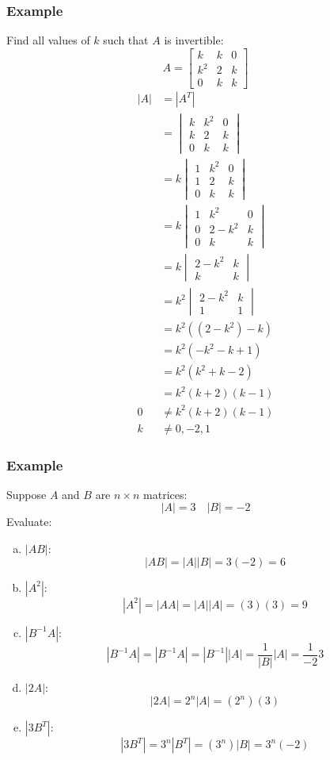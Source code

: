 \documentclass{math}
\begin{document}
\subsubsection*{Example}
Find all values of \( k \) such that \( A \) is invertible:
\[ A = \begin{bmatrix}k & k & 0 \\ k^2 & 2 & k \\ 0 & k & k\end{bmatrix} \]
\begin{align*}
  |A| &= |A^T| \\
  &= \begin{vmatrix}
    k & k^2 & 0 \\
    k & 2 & k \\
    0 & k & k
  \end{vmatrix} \\
  &= k\begin{vmatrix}
    1 & k^2 & 0 \\
    1 & 2 & k \\
    0 & k & k
  \end{vmatrix} \\
  &= k\begin{vmatrix}
    1 & k^2 & 0 \\
    0 & 2-k^2 & k \\
    0 & k & k
  \end{vmatrix} \\
  &= k\begin{vmatrix}
    2-k^2 & k \\
    k & k
  \end{vmatrix} \\
  &= k^2\begin{vmatrix}
    2-k^2 & k \\
    1 & 1
  \end{vmatrix} \\
  &= k^2((2-k^2)-k) \\
  &= k^2(-k^2-k+1) \\
  &= k^2(k^2+k-2) \\
  &= k^2(k+2)(k-1) \\
  0 &\ne k^2(k+2)(k-1) \\
  k &\ne 0,-2,1
\end{align*}

\subsubsection*{Example}
Suppose \( A \) and \( B \) are \( n\times n \) matrices:
\[ |A| = 3 \quad |B| = -2\]
Evaluate:
\begin{enumerate}[(a)]
  \item \( |AB| \):
  \[ |AB| = |A||B| = 3(-2) = 6 \]
  \item \( |A^2| \):
  \[ |A^2| = |AA| = |A||A| = (3)(3) = 9 \]
  \item \( |B^{-1}A| \):
  \[ |B^{-1}A| = |B^{-1}A| = |B^{-1}||A| = \frac{1}{|B|}|A| = \frac{1}{-2}3 \]
  \item \( |2A| \):
  \[ |2A| = 2^n|A| = (2^n)(3) \]
  \item \( |3B^T| \):
  \[ |3B^T| = 3^n|B^T| = (3^n)|B| = 3^n(-2) \]
\end{enumerate}
\end{document}
